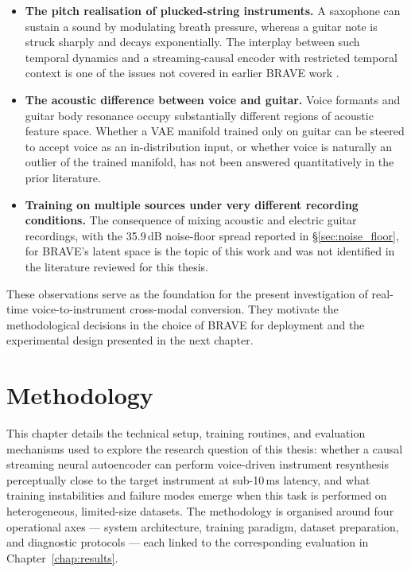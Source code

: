 \documentclass[a4paper,11pt,oneside,openany]{book}
\begin{document}
\begin{itemize}
\item \textbf{The pitch realisation of plucked-string instruments.} A saxophone can sustain a sound by modulating breath pressure, whereas a guitar note is struck sharply and decays exponentially. The interplay between such temporal dynamics and a streaming-causal encoder with restricted temporal context is one of the issues not covered in earlier BRAVE work \parencite{caspe2025brave}.
\item \textbf{The acoustic difference between voice and guitar.} Voice formants and guitar body resonance occupy substantially different regions of acoustic feature space. Whether a VAE manifold trained only on guitar can be steered to accept voice as an in-distribution input, or whether voice is naturally an outlier of the trained manifold, has not been answered quantitatively in the prior literature.
\item \textbf{Training on multiple sources under very different recording conditions.} The consequence of mixing acoustic and electric guitar recordings, with the 35.9\,dB noise-floor spread reported in \S\ref{sec:noise_floor}, for BRAVE's latent space is the topic of this work and was not identified in the literature reviewed for this thesis.
\end{itemize}

These observations serve as the foundation for the present investigation of real-time voice-to-instrument cross-modal conversion. They motivate the methodological decisions in the choice of BRAVE for deployment and the experimental design presented in the next chapter.

\chapter{Methodology}\label{chap:methodology}

This chapter details the technical setup, training routines, and evaluation mechanisms used to explore the research question of this thesis: whether a causal streaming neural autoencoder can perform voice-driven instrument resynthesis perceptually close to the target instrument at sub-10\,ms latency, and what training instabilities and failure modes emerge when this task is performed on heterogeneous, limited-size datasets. The methodology is organised around four operational axes --- system architecture, training paradigm, dataset preparation, and diagnostic protocols --- each linked to the corresponding evaluation in Chapter~\ref{chap:results}.
\end{document}
